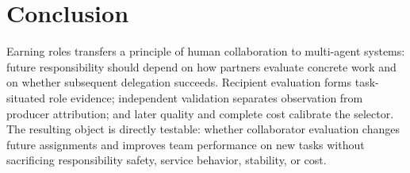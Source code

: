 \documentclass[sigconf,anonymous]{aamas}
\begin{document}
\section{Conclusion}
Earning roles transfers a principle of human collaboration to multi-agent systems: future responsibility should depend on how partners evaluate concrete work and on whether subsequent delegation succeeds. Recipient evaluation forms task-situated role evidence; independent validation separates observation from producer attribution; and later quality and complete cost calibrate the selector. The resulting object is directly testable: whether collaborator evaluation changes future assignments and improves team performance on new tasks without sacrificing responsibility safety, service behavior, stability, or cost.

\clearpage


\end{document}

